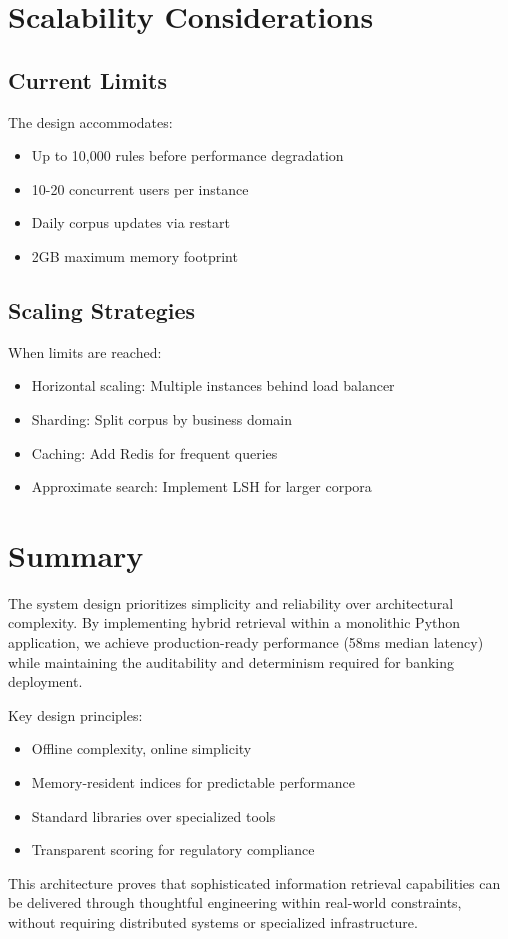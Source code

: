\section{Scalability Considerations}

\subsection{Current Limits}

The design accommodates:
\begin{itemize}[leftmargin=*,itemsep=2pt,topsep=2pt]
  \item Up to 10,000 rules before performance degradation
  \item 10-20 concurrent users per instance
  \item Daily corpus updates via restart
  \item 2GB maximum memory footprint
\end{itemize}

\subsection{Scaling Strategies}

When limits are reached:
\begin{itemize}[leftmargin=*,itemsep=2pt,topsep=2pt]
  \item Horizontal scaling: Multiple instances behind load balancer
  \item Sharding: Split corpus by business domain
  \item Caching: Add Redis for frequent queries
  \item Approximate search: Implement LSH for larger corpora
\end{itemize}

\section{Summary}

The system design prioritizes simplicity and reliability over architectural complexity. By implementing hybrid retrieval within a monolithic Python application, we achieve production-ready performance (58ms median latency) while maintaining the auditability and determinism required for banking deployment.

Key design principles:
\begin{itemize}[leftmargin=*,itemsep=2pt,topsep=2pt]
  \item Offline complexity, online simplicity
  \item Memory-resident indices for predictable performance
  \item Standard libraries over specialized tools
  \item Transparent scoring for regulatory compliance
\end{itemize}

This architecture proves that sophisticated information retrieval capabilities can be delivered through thoughtful engineering within real-world constraints, without requiring distributed systems or specialized infrastructure.
